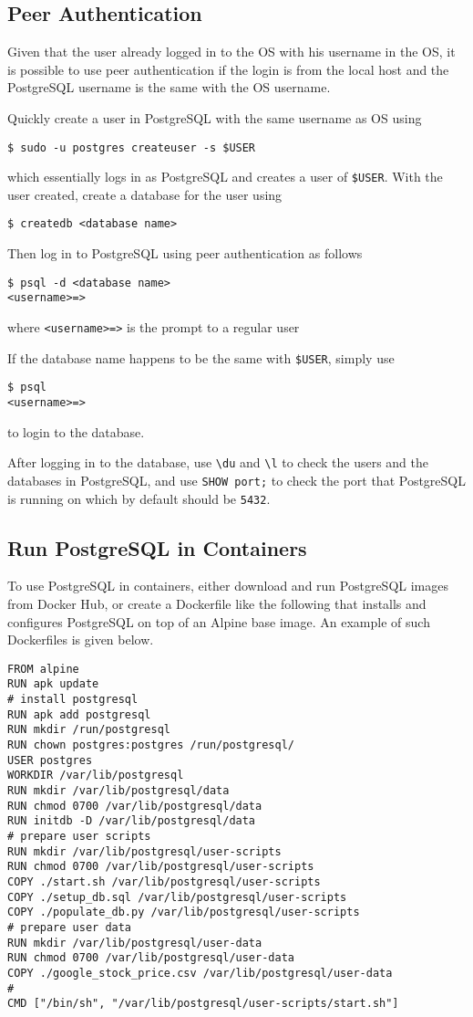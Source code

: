 \subsection{Peer Authentication}

Given that the user already logged in to the OS with his username in the OS, it is possible to use peer authentication if the login is from the local host and the PostgreSQL username is the same with the OS username.

Quickly create a user in PostgreSQL with the same username as OS using
\begin{lstlisting}
$ sudo -u postgres createuser -s $USER
\end{lstlisting}
which essentially logs in as PostgreSQL and creates a user of \verb|$USER|. With the user created, create a database for the user using
\begin{lstlisting}
$ createdb <database name>
\end{lstlisting}
Then log in to PostgreSQL using peer authentication as follows
\begin{lstlisting}
$ psql -d <database name>
<username>=>
\end{lstlisting}
where \verb|<username>=>| is the prompt to a regular user

If the database name happens to be the same with \verb|$USER|, simply use
\begin{lstlisting}
$ psql
<username>=>
\end{lstlisting}
to login to the database.

After logging in to the database, use \verb|\du| and \verb|\l| to check the users and the databases in PostgreSQL, and use \verb|SHOW port;| to check the port that PostgreSQL is running on which by default should be \verb|5432|.

\subsection{Run PostgreSQL in Containers}

To use PostgreSQL in containers, either download and run PostgreSQL images from Docker Hub, or create a Dockerfile like the following that installs and configures PostgreSQL on top of an Alpine base image. An example of such Dockerfiles is given below.
\begin{lstlisting}
FROM alpine
RUN apk update
# install postgresql
RUN apk add postgresql
RUN mkdir /run/postgresql
RUN chown postgres:postgres /run/postgresql/
USER postgres
WORKDIR /var/lib/postgresql
RUN mkdir /var/lib/postgresql/data
RUN chmod 0700 /var/lib/postgresql/data
RUN initdb -D /var/lib/postgresql/data
# prepare user scripts
RUN mkdir /var/lib/postgresql/user-scripts
RUN chmod 0700 /var/lib/postgresql/user-scripts
COPY ./start.sh /var/lib/postgresql/user-scripts
COPY ./setup_db.sql /var/lib/postgresql/user-scripts
COPY ./populate_db.py /var/lib/postgresql/user-scripts
# prepare user data
RUN mkdir /var/lib/postgresql/user-data
RUN chmod 0700 /var/lib/postgresql/user-data
COPY ./google_stock_price.csv /var/lib/postgresql/user-data
#
CMD ["/bin/sh", "/var/lib/postgresql/user-scripts/start.sh"]
\end{lstlisting}

